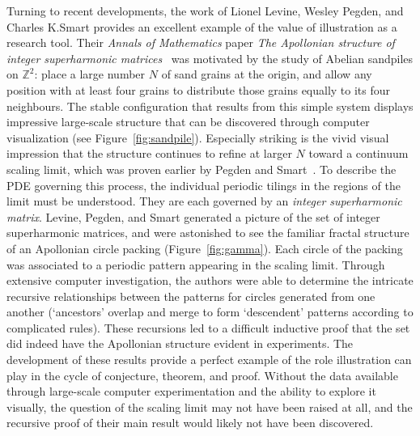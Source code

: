 \documentclass{notices}
\begin{document}
Turning to recent developments, the work of Lionel Levine, Wesley Pegden, and Charles K.\@ Smart provides an excellent example of the value of illustration as a research tool. Their \emph{Annals of Mathematics} paper \emph{The Apollonian structure of integer superharmonic matrices}~\cite{LPS17} was motivated by the study of Abelian sandpiles on $\mathbb{Z}^2$:  place a large number $N$ of sand grains at the origin, and allow any position with at least four grains to distribute those grains equally to its four neighbours.  The stable configuration that results from this simple system displays impressive large-scale structure that can be discovered through computer visualization (see Figure~\ref{fig:sandpile}). Especially striking is the vivid visual impression that the structure continues to refine at larger $N$ toward a continuum scaling limit, which was proven earlier by Pegden and Smart~\cite{PS13}. To describe the PDE governing this process, the individual periodic tilings in the regions of the limit must be understood.  They are each governed by an \emph{integer superharmonic matrix}.  Levine, Pegden, and Smart generated a picture of the set of integer superharmonic matrices, and were astonished to see the familiar fractal structure of an Apollonian circle packing (Figure~\ref{fig:gamma}).
Each circle of the packing was associated to a periodic pattern appearing in the scaling limit. Through extensive computer investigation, the authors were able to determine the intricate recursive relationships between the patterns for circles generated from one another (`ancestors' overlap and merge to form `descendent' patterns according to complicated rules).  These recursions led to a difficult inductive proof that the set did indeed have the Apollonian structure evident in experiments.  The development of these results provide a perfect example of the role illustration can play in the cycle of conjecture, theorem, and proof.  Without the data available through large-scale computer experimentation and the ability to explore it visually, the question of the scaling limit may not have been raised at all, and the recursive proof of their main result would likely not have been discovered.%
\end{document}
